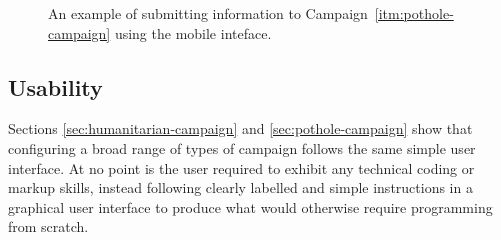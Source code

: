 \documentclass{article}
\begin{document}
		\begin{figure}[ht]
			\centering
			\caption{An example of submitting information to Campaign~\ref{itm:pothole-campaign} using the mobile inteface.}
			\label{fig:eval-mobile-2}
		\end{figure}

		\FloatBarrier

		\subsection{Usability}

		Sections \ref{sec:humanitarian-campaign} and \ref{sec:pothole-campaign} show that configuring a broad range of types of campaign follows the same simple user interface. At no point is the user required to exhibit any technical coding or markup skills, instead following clearly labelled and simple instructions in a graphical user interface to produce what would otherwise require programming from scratch.
\end{document}
